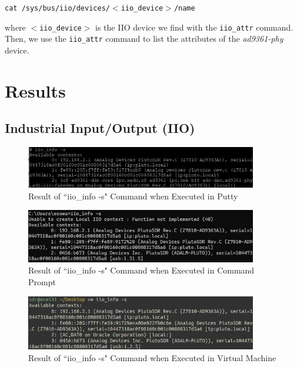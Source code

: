 \documentclass{article}
\begin{document}
\begin{center}
\texttt{cat /sys/bus/iio/devices/$<$iio\_device$>$/name}
\end{center}

where \texttt{$<$iio\_device$>$} is the IIO device we find with the \texttt{iio\_attr} command. Then, we use the \texttt{iio\_attr} command to list the attributes of the \textit{ad9361-phy} device.


\section{Results}
\subsection{Industrial Input/Output (IIO)}

\begin{figure}[H]
	\centerline{\includegraphics[width=0.9\textwidth]{iio_info_putty.png}}
	\caption{Result of ``iio\_info -s" Command when Executed in Putty}
	\label{fig::iio_info_putty}
\end{figure}

\begin{figure}[H]
	\centerline{\includegraphics[width=0.9\textwidth]{iio_info_cmd.png}}
	\caption{Result of ``iio\_info -s" Command when Executed in Command Prompt}
	\label{fig::iio_info_cmd}
\end{figure}

\begin{figure}[H]
	\centerline{\includegraphics[width=0.9\textwidth]{iio_info_vm.png}}
	\caption{Result of ``iio\_info -s" Command when Executed in Virtual Machine}
	\label{fig::iio_info_vm}
\end{figure}
\end{document}
